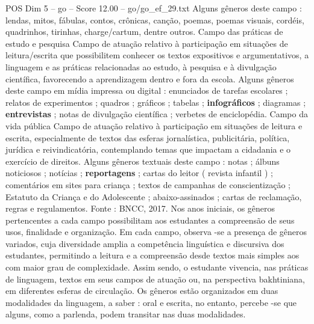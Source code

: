 \begin{textsample}{POS Dim 5 – go – Score 12.00 – go/go\_ef\_29.txt}
Alguns gêneros deste campo : lendas, mitos, fábulas, contos, crônicas, canção, poemas, poemas visuais, cordéis, quadrinhos, tirinhas, charge/cartum, dentre outros.
Campo das práticas de estudo e pesquisa Campo de atuação relativo à participação em situações de leitura/escrita que possibilitem conhecer os textos expositivos e argumentativos, a linguagem e as práticas relacionadas ao estudo, à pesquisa e à divulgação científica, favorecendo a aprendizagem dentro e fora da escola.
Alguns gêneros deste campo em mídia impressa ou digital : enunciados de tarefas escolares ; relatos de experimentos ; quadros ; gráficos ; tabelas ; \textbf{infográficos} ; diagramas ; \textbf{entrevistas} ; notas de divulgação científica ; verbetes de enciclopédia.
Campo da vida pública Campo de atuação relativo à participação em situações de leitura e escrita, especialmente de textos das esferas jornalística, publicitária, política, jurídica e reivindicatória, contemplando temas que impactam a cidadania e o exercício de direitos.
Alguns gêneros textuais deste campo : notas ; álbuns noticiosos ; notícias ; \textbf{reportagens} ; cartas do leitor ( revista infantil ) ; comentários em sites para criança ; textos de campanhas de conscientização ; Estatuto da Criança e do Adolescente ; abaixo-assinados ; cartas de reclamação, regras e regulamentos.
Fonte : BNCC, 2017.
Nos anos iniciais, os gêneros pertencentes a cada campo possibilitam aos estudantes a compreensão de seus usos, finalidade e organização.
Em cada campo, observa -se a presença de gêneros variados, cuja diversidade amplia a competência linguística e discursiva dos estudantes, permitindo a leitura e a compreensão desde textos mais simples aos com maior grau de complexidade.
Assim sendo, o estudante vivencia, nas práticas de linguagem, textos em seus campos de atuação ou, na perspectiva bakhtiniana, em diferentes esferas de circulação.
Os gêneros estão organizados em duas modalidades da linguagem, a saber : oral e escrita, no entanto, percebe -se que alguns, como a parlenda, podem transitar nas duas modalidades.

\end{textsample}
